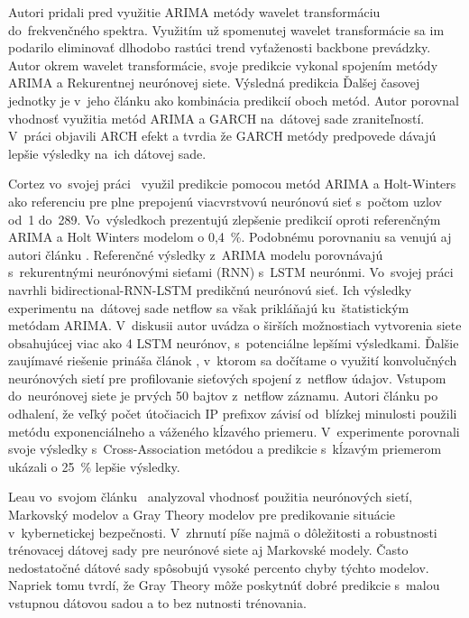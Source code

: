 \documentclass[thesismargins, thesislinespacing, openright, upjsfrontpage]{rnthesis}
\begin{document}
Autori \cite{madan2018predicting,papagiannaki2005long} pridali pred využitie ARIMA metódy wavelet transformáciu do~frekvenčného spektra. Využitím už spomenutej wavelet transformácie sa im podarilo eliminovať dlhodobo rastúci trend vyťaženosti backbone prevádzky. Autor \cite{madan2018predicting} okrem wavelet transformácie, svoje predikcie vykonal spojením metódy ARIMA a Rekurentnej neurónovej siete. Výsledná predikcia Ďalšej časovej jednotky je v~jeho článku ako kombinácia predikcií oboch metód. Autor \cite{tang2016exploiting} porovnal vhodnosť využitia metód ARIMA a GARCH na~dátovej sade zraniteľností. V~práci objavili ARCH efekt a tvrdia že GARCH metódy predpovede dávajú lepšie výsledky na~ich dátovej sade.

Cortez vo~svojej práci~\cite{cortez2012multi} využil predikcie pomocou metód ARIMA a Holt-Winters ako referenciu pre plne prepojenú viacvrstvovú neurónovú sieť s~počtom uzlov od~1 do~289. Vo~výsledkoch prezentujú zlepšenie predikcií oproti referenčným ARIMA a Holt Winters modelom o 0,4~\%. Podobnému porovnaniu sa venujú aj autori článku \cite{fang2019deep}. Referenčné výsledky z~ARIMA modelu porovnávajú s~rekurentnými neurónovými sieťami (RNN) s~LSTM neurónmi. Vo~svojej práci navrhli bidirectional-RNN-LSTM predikčnú neurónovú sieť. Ich výsledky experimentu na~dátovej sade netflow sa však prikláňajú ku~štatistickým metódam ARIMA. V~diskusii autor uvádza o širších možnostiach vytvorenia siete obsahujúcej viac ako 4 LSTM neurónov, s~potenciálne lepšími výsledkami. Ďalšie zaujímavé riešenie prináša článok \cite{millar2019using}, v~ktorom sa dočítame o využití konvolučných neurónových sietí pre profilovanie sieťových spojení z~netflow údajov. Vstupom do~neurónovej siete je prvých 50 bajtov z~netflow záznamu. Autori článku \cite{soldo2011blacklisting} po odhalení, že veľký počet útočiacich IP prefixov závisí od~blízkej minulosti použili metódu exponenciálneho a váženého kĺzavého priemeru. V~experimente porovnali svoje výsledky s~Cross-Association metódou a predikcie s~kĺzavým priemerom ukázali o 25~\% lepšie výsledky.

Leau vo~svojom článku~\cite{Leau2015} analyzoval vhodnosť použitia neurónových sietí, Markovský modelov a Gray Theory modelov pre predikovanie situácie v~kybernetickej bezpečnosti. V~zhrnutí píše najmä o dôležitosti a robustnosti trénovacej dátovej sady pre neurónové siete aj Markovské modely. Často nedostatočné dátové sady spôsobujú vysoké percento chyby týchto modelov. Napriek tomu tvrdí, že Gray Theory môže poskytnúť dobré predikcie s~malou vstupnou dátovou sadou a to bez nutnosti trénovania.
\end{document}
